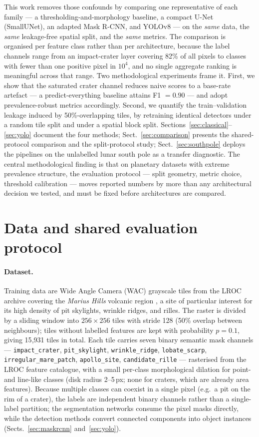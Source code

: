 \documentclass{aa}
\begin{document}
This work removes those confounds by comparing one representative of each family --- a thresholding-and-morphology baseline, a compact U-Net (SmallUNet), an adapted Mask R-CNN, and YOLOv8 --- on the \emph{same} data, the \emph{same} leakage-free spatial split, and the \emph{same} metrics. The comparison is organised per feature class rather than per architecture, because the label channels range from an impact-crater layer covering 82\% of all pixels to classes with fewer than one positive pixel in $10^{4}$, and no single aggregate ranking is meaningful across that range. Two methodological experiments frame it. First, we show that the saturated crater channel reduces naive scores to a base-rate artefact --- a predict-everything baseline attains F1 $=0.90$ --- and adopt prevalence-robust metrics accordingly. Second, we quantify the train--validation leakage induced by 50\%-overlapping tiles, by retraining identical detectors under a random tile split and under a spatial block split. Sections~\ref{sec:classical}--\ref{sec:yolo} document the four methods; Sect.~\ref{sec:comparison} presents the shared-protocol comparison and the split-protocol study; Sect.~\ref{sec:southpole} deploys the pipelines on the unlabelled lunar south pole as a transfer diagnostic. The central methodological finding is that on planetary datasets with extreme prevalence structure, the evaluation protocol --- split geometry, metric choice, threshold calibration --- moves reported numbers by more than any architectural decision we tested, and must be fixed before architectures are compared.


\section{Data and shared evaluation protocol}
\label{sec:mr_dataset}

\paragraph{Dataset.}
Training data are Wide Angle Camera (WAC) grayscale tiles from the LROC archive covering the \textit{Marius Hills} volcanic region \citep{mariusdata}, a site of particular interest for its high density of pit skylights, wrinkle ridges, and rilles. The raster is divided by a sliding window into $256\times256$ tiles with stride 128 (50\% overlap between neighbours); tiles without labelled features are kept with probability $p=0.1$, giving 15{,}931 tiles in total. Each tile carries seven binary semantic mask channels --- \texttt{impact\_crater}, \texttt{pit\_skylight}, \texttt{wrinkle\_ridge}, \texttt{lobate\_scarp}, \texttt{irregular\_mare\_patch}, \texttt{apollo\_site}, \texttt{candidate\_rille} --- rasterised from the LROC feature catalogue, with a small per-class morphological dilation for point- and line-like classes (disk radius 2--5\,px; none for craters, which are already area features). Because multiple classes can coexist in a single pixel (e.g.\ a pit on the rim of a crater), the labels are independent binary channels rather than a single-label partition; the segmentation networks consume the pixel masks directly, while the detection methods convert connected components into object instances (Sects.~\ref{sec:maskrcnn} and~\ref{sec:yolo}).
\end{document}
